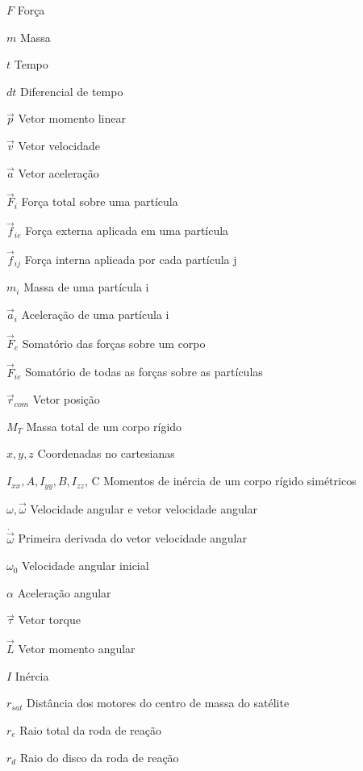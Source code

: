 \begin{simbolos}
  \item[$F$] Força
  \item[$m$] Massa
  \item[$t$] Tempo
  \item[$dt$] Diferencial de tempo
  \item[$\vec{p}$] Vetor momento linear
  \item[$\vec{v}$] Vetor velocidade
  \item[$\vec{a}$] Vetor aceleração
  \item[$\vec{F}_i$] Força total sobre uma partícula
  \item[$\vec{f}_{ie}$] Força externa aplicada em uma partícula
  \item[$\vec{f}_{ij}$] Força interna aplicada por cada partícula j
  \item[$m_i$] Massa de uma partícula i
  \item[$\vec{a}_i$] Aceleração de uma partícula i
  \item[$\vec{F}_e$] Somatório das forças sobre um corpo
  \item[$\vec{F}_{ie}$] Somatório de todas as forças sobre as partículas
  \item[$\vec{r}_{com}$] Vetor posição 
  \item[$M_T$] Massa total de um corpo rígido
  \item[$x,y,z$] Coordenadas no cartesianas
  \item[$I_{xx}, A, I_{yy}, B, I_{zz}$, C] Momentos de inércia de um corpo rígido simétricos 
  \item[$\omega,  \vec{\omega}$] Velocidade angular e vetor velocidade angular
  \item[$\dot{\vec{\omega}}$] Primeira derivada do vetor velocidade angular
  \item[$\omega_0$] Velocidade angular inicial
  \item[$\alpha$] Aceleração angular
  \item[$\vec{\tau}$] Vetor torque
  \item[$\vec{L}$] Vetor momento angular
  \item[$I$] Inércia
  \item[$r_{sat}$] Distância dos motores do centro de massa do satélite
  \item[$r_{e}$] Raio total da roda de reação
  \item[$r_{d}$] Raio do disco da roda de reação

\end{simbolos}
